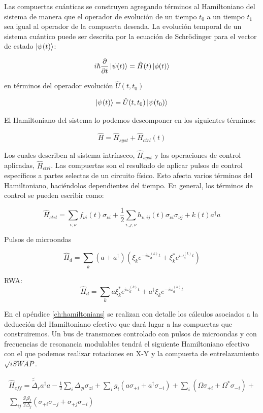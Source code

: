 Las compuertas cuánticas se construyen agregando términos al Hamiltoniano del sistema de manera que el operador de evolución de un tiempo $t_0$ a un tiempo $t_1$ sea igual al operador de la compuerta deseada. La evolución temporal de un sistema cuántico puede ser descrita por la ecuación de Schrödinger para el vector de estado $\ket{\psi(t)}$:

\[
i \hbar \frac{\partial}{\partial t} \ket{\psi(t)} = \hat{H}(t) \ket{\phi(t)}
\]

en términos del operador evolución $\hat{U}(t,t_0)$

\[
\ket{\psi(t)} = \hat{U}(t,t_0) \ket{\psi(t_0)}
\]

El Hamiltoniano del sistema lo podemos descomponer en los siguientes términos:

\[
\hat{H} = \hat{H}_{syst} + \hat{H}_{ctrl}(t)
\]

Los cuales describen al sistema intrínseco, $\hat{H}_{syst}$ y las operaciones de control aplicadas, $\hat{H}_{ctrl}$. Las compuertas son el resultado de aplicar pulsos de control específicos a partes selectas de un circuito físico. Esto afecta varios términos del Hamiltoniano, haciéndolos dependientes del tiempo. En general, los términos de control se pueden escribir como:

\[
\hat{H}_{ctrl} = \sum\limits_{i; \nu} f_{\nu i}(t) \sigma_{\nu i} + \frac{1}{2} \sum\limits_{i,j;\nu} h_{\nu, ij}(t) \sigma_{\nu i} \sigma_{\nu j} + k(t) a^\dag a
\]

Pulsos de microondas

$$\hat{H}_d = \sum\limits_k (a+a^\dagger) (\xi_k e^{-i\omega_d^{(k)}t} + \xi_k^*e^{i\omega_d^{(k)}t})$$

RWA: $$\hat{H}_d=\sum\limits_k a\xi_k^*e^{i\omega_d^{(k)}t}+ a^\dagger\xi_ke^{-i\omega_d^{(k)}t}$$

En el apéndice \ref{ch:hamiltonians} se realizan con detalle los cálculos asociados a la deducción del Hamiltoniano efectivo que dará lugar a las compuertas que construiremos. Un bus de transmones controlado con pulsos de microondas y con frecuencias de resonancia modulables tendrá el siguiente Hamiltoniano efectivo con el que podemos realizar rotaciones en X-Y y la compuerta de entrelazamiento $\sqrt{iSWAP}$.

\begin{multline}
\hat{H}_{eff} = \tilde{\tilde{\Delta}}_r a^\dagger a - \frac{1}{2} \sum\limits_i \Delta_{qi} \sigma_{zi} + \sum\limits_i g_i (a \sigma_{+i} + a^\dagger \sigma_{-i}) + \sum\limits_i (\Omega \sigma_{+i} + \Omega^* \sigma_{-i}) + \\
\sum\limits_{ij} \frac{g_i g_j}{2 \Delta_j} \left(\sigma_{+i} \sigma_{-j} + \sigma_{+j} \sigma_{-i}\right)
\end{multline}

